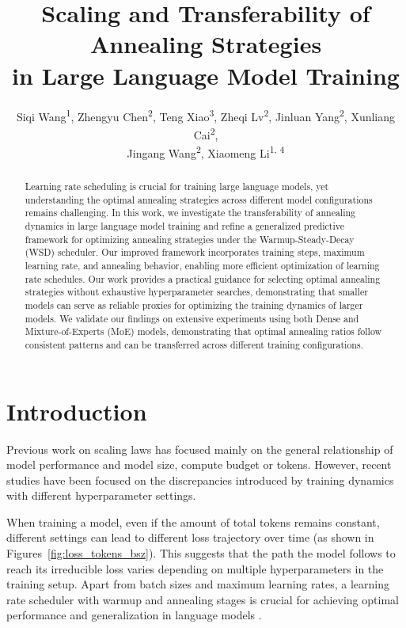 \documentclass[letterpaper]{article} %
\title{Scaling and Transferability of Annealing Strategies \\ in Large Language Model Training}
\author{
    Siqi Wang\textsuperscript{\rm 1},
    Zhengyu Chen\textsuperscript{\rm 2},
    Teng Xiao\textsuperscript{\rm 3},
    Zheqi Lv\textsuperscript{\rm 2},
    Jinluan Yang\textsuperscript{\rm 2},
    Xunliang Cai\textsuperscript{\rm 2}, \\
    Jingang Wang\textsuperscript{\rm 2},
    Xiaomeng Li\textsuperscript{\rm 1, 4}
}
\begin{document}
\maketitle

\begin{abstract}
Learning rate scheduling is crucial for training large language models, yet understanding the optimal annealing strategies across different model configurations remains challenging. In this work, we investigate the transferability of annealing dynamics in large language model training and refine a generalized predictive framework for optimizing annealing strategies under the Warmup-Steady-Decay (WSD) scheduler. Our improved framework incorporates training steps, maximum learning rate, and annealing behavior, enabling more efficient optimization of learning rate schedules. Our work provides a practical guidance for selecting optimal annealing strategies without exhaustive hyperparameter searches, demonstrating that smaller models can serve as reliable proxies for optimizing the training dynamics of larger models. We validate our findings on extensive experiments using both Dense and Mixture-of-Experts (MoE) models, demonstrating that optimal annealing ratios follow consistent patterns and can be transferred across different training configurations. 
\end{abstract}

\begin{links}
\end{links}



\section{Introduction}

Previous work \citep{Kaplan2020ScalingLF, Hoffmann2022TrainingCL, rae2021scaling} on scaling laws has focused mainly on the general relationship of model performance and model size, compute budget or tokens. However, recent studies \citep{tissue2024scaling, hagele2024scaling} have been focused on the discrepancies introduced by training dynamics with different hyperparameter settings.

When training a model, even if the amount of total tokens remains constant, different settings can lead to different loss trajectory over time (as shown in Figures~\ref{fig:loss_tokens_bsz}). This suggests that the path the model follows to reach its irreducible loss varies depending on multiple hyperparameters in the training setup. Apart from batch sizes and maximum learning rates, a learning rate scheduler with warmup and annealing stages is crucial for achieving optimal performance and generalization in language models \cite{He2015DeepRL, Goyal2017AccurateLM, Popel2018TrainingTF, You2019LearningSP}.
\end{document}

